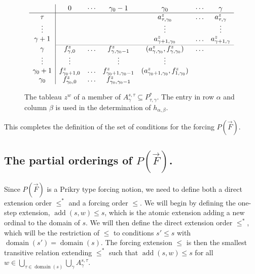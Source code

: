 \documentclass[
twoside,
]{article}
\theoremstyle{definition}
\theoremstyle{remark}
\DeclareMathOperator{\add}{add}
\DeclareMathOperator{\domain}{domain}
\begin{document}
\begin{figure}[]
\renewcommand{\arraystretch}{1.25}
\begin{equation*}
  \begin{array}{c|cccccc} 
    &0&\cdots&\gamma_0-1&\gamma_0&\cdots&\gamma \\
    \hline 
    \tau & & &  &a^{z}_{\tau,\gamma_0}&\dots& a^{z}_{\tau,\gamma}
    \\
    \vdots&&&&\vdots&&\vdots
    \\
    \gamma+1&&&&a^{z}_{\gamma+1,\gamma_0}& \dots&a^{z}_{\gamma+1,\gamma}
    \\[2pt]
    \arrayrulecolor{gray}\cline{2-7}\arrayrulecolor{black}
    \gamma& f^{z}_{\gamma,0}& \dots&f^z_{\gamma,\gamma_0-1}&(a^{z}_{\gamma,\gamma_0},f^z_{\gamma,\gamma_0})&\dots&
    \\
    \vdots&\vdots&&\vdots&\vdots&&
    \\
    \gamma_0+1& f^{z}_{\gamma_0+1,0}& \dots&f^{z}_{\gamma_0+1,\gamma_0-1}&
    (a^{z}_{\gamma_0+1,\gamma_0},f^{z}_{1,\gamma_0})& &
    \\
    \gamma_0& f^{z}_{\gamma_0,0}&\dots&f^{z}_{\gamma_0,\gamma_0-1}&&& \\
  \end{array}
\end{equation*}
  \caption{The tableau $z^w$ of a member of
    $A_{\gamma}^{s,\tau}\subseteq P^*_{\tau,\gamma}$. 
    The entry in row $\alpha$ and column $\beta$ is used in the
    determination of   $h_{\alpha,\beta}$.}
\label{fig:member-of-A}
\end{figure}

This completes the definition of the set of conditions for the forcing
$P(\vec F)$.




\subsection{The partial orderings of $P(\vec F)$.}
\label{sec:PForder}

Since $P(\vec F)$  is a
Prikry type forcing notion, we need to define both a direct extension
order $\leq^*$ and  a forcing order $\leq$.  
We will begin by defining the one-step extension, $\add(s,w)\leq s$,
 which is the atomic extension adding a new ordinal to the domain
of $s$.   We will then define the direct extension order $\leq^{*}$, which
will be the restriction of $\le$ to conditions $s'\leq s$ with $\domain(s')=\domain(s)$.
The forcing extension $\leq$ is then the smallest transitive relation
extending ${\leq^*}$ such that 
$\add(s,w)\leq s$ for all
$w\in\bigcup_{\tau\in\domain(s)}\bigcup_{\gamma}A^{s,\tau}_{\gamma}$. 
\end{document}
